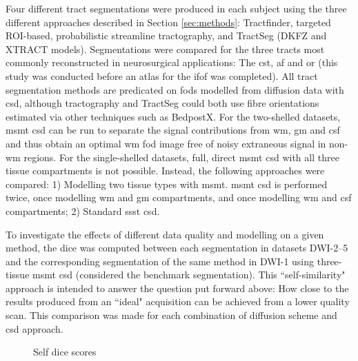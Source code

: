 Four different tract segmentations were produced in each subject using the three different approaches described in Section \ref{sec:methods}: Tractfinder, targeted ROI-based, probabilistic streamline tractography, and TractSeg (DKFZ and XTRACT models).
Segmentations were compared for the three tracts most commonly reconstructed in neurosurgical applications:
The \gls{cst}, \gls{af} and \gls{or} (this study was conducted before an atlas for the \gls{ifof} was completed).
All tract segmentation methods are predicated on \glspl{fod} modelled from diffusion data with \gls{csd}, although tractography and TractSeg could both use fibre orientations estimated via other techniques such as BedpostX\autocite{Behrens2007}.
For the two-shelled datasets, \gls{msmt} \gls{csd} can be run to separate the signal contributions from \gls{wm}, \gls{gm} and \gls{csf} and thus obtain an optimal \gls{wm} \gls{fod} image free of noisy extraneous signal in non-\gls{wm} regions.
For the single-shelled datasets, full, direct \gls{msmt} \gls{csd} with all three tissue compartments is not possible.
Instead, the following approaches were compared: 1) Modelling two tissue types with \gls{msmt}.
\gls{msmt} \gls{csd} is performed twice, once modelling \gls{wm} and \gls{gm} compartments, and once modelling \gls{wm} and \gls{csf} compartments; 2) Standard \gls{ssst} \gls{csd}.

To investigate the effects of different data quality and modelling on a given method, the \gls{dice} \autocite{Dice1945} was computed between each segmentation in datasets DWI-2--5 and the corresponding segmentation of the same method in DWI-1 using three-tissue \gls{msmt} \gls{csd} (considered the benchmark segmentation).
This ``self-similarity" approach is intended to answer the question put forward above:
How close to the results produced from an ``ideal" acquisition can be achieved from a lower quality scan.
This comparison was made for each combination of diffusion scheme and \gls{csd} approach.


\begin{figure}
  \centering
  
  \caption{Self dice scores }
  \label{fig:self_dice}
\end{figure}

